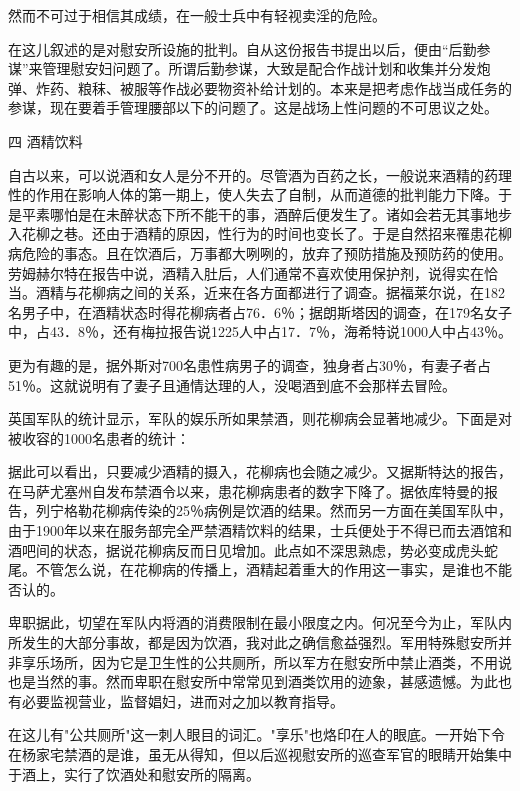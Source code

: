 \documentclass[12pt,UTF8]{ctexbook}
\begin{document}
然而不可过于相信其成绩，在一般士兵中有轻视卖淫的危险。

在这儿叙述的是对慰安所设施的批判。自从这份报告书提出以后，便由“后勤参谋”来管理慰安妇问题了。所谓后勤参谋，大致是配合作战计划和收集并分发炮弹、炸药、粮秣、被服等作战必要物资补给计划的。本来是把考虑作战当成任务的参谋，现在要着手管理腰部以下的问题了。这是战场上性问题的不可思议之处。

四 酒精饮料

自古以来，可以说酒和女人是分不开的。尽管酒为百药之长，一般说来酒精的药理性的作用在影响人体的第一期上，使人失去了自制，从而道德的批判能力下降。于是平素哪怕是在未醉状态下所不能干的事，酒醉后便发生了。诸如会若无其事地步入花柳之巷。还由于酒精的原因，性行为的时间也变长了。于是自然招来罹患花柳病危险的事态。且在饮酒后，万事都大咧咧的，放弃了预防措施及预防药的使用。劳姆赫尔特在报告中说，酒精入肚后，人们通常不喜欢使用保护剂，说得实在恰当。酒精与花柳病之间的关系，近来在各方面都进行了调查。据福莱尔说，在182名男子中，在酒精状态时得花柳病者占76．6％；据朗斯塔因的调查，在179名女子中，占43．8％，还有梅拉报告说1225人中占17．7％，海希特说1000人中占43％。



更为有趣的是，据外斯对700名患性病男子的调查，独身者占30％，有妻子者占51％。这就说明有了妻子且通情达理的人，没喝酒到底不会那样去冒险。



英国军队的统计显示，军队的娱乐所如果禁酒，则花柳病会显著地减少。下面是对被收容的1000名患者的统计：



据此可以看出，只要减少酒精的摄入，花柳病也会随之减少。又据斯特达的报告，在马萨尤塞州自发布禁酒令以来，患花柳病患者的数字下降了。据依库特曼的报告，列宁格勒花柳病传染的25％病例是饮酒的结果。然而另一方面在美国军队中，由于1900年以来在服务部完全严禁酒精饮料的结果，士兵便处于不得已而去酒馆和酒吧间的状态，据说花柳病反而日见增加。此点如不深思熟虑，势必变成虎头蛇尾。不管怎么说，在花柳病的传播上，酒精起着重大的作用这一事实，是谁也不能否认的。



卑职据此，切望在军队内将酒的消费限制在最小限度之内。何况至今为止，军队内所发生的大部分事故，都是因为饮酒，我对此之确信愈益强烈。军用特殊慰安所并非享乐场所，因为它是卫生性的公共厕所，所以军方在慰安所中禁止酒类，不用说也是当然的事。然而卑职在慰安所中常常见到酒类饮用的迹象，甚感遗憾。为此也有必要监视营业，监督娼妇，进而对之加以教育指导。



在这儿有"公共厕所"这一刺人眼目的词汇。"享乐"也烙印在人的眼底。一开始下令在杨家宅禁酒的是谁，虽无从得知，但以后巡视慰安所的巡查军官的眼睛开始集中于酒上，实行了饮酒处和慰安所的隔离。
\end{document}
